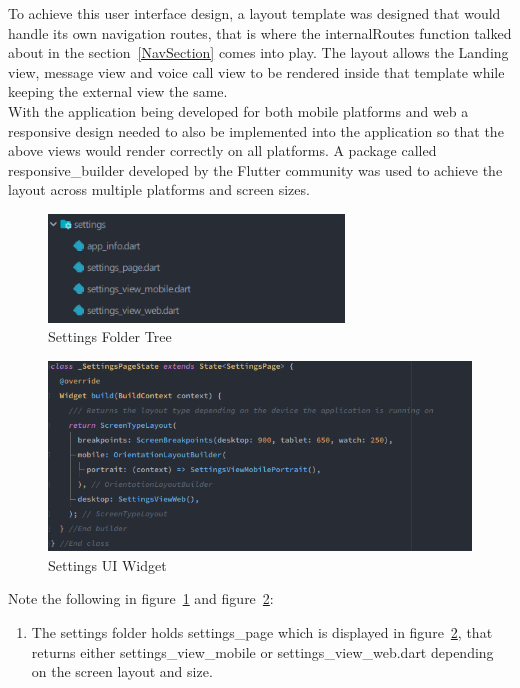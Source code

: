 To achieve this user interface design, a layout template was designed that would handle its own navigation routes, that is where the internalRoutes function talked about in the section~\ref{NavSection} comes into play. The layout allows the Landing view, message view and voice call view to be rendered inside that template while keeping the external view the same.
\\ With the application being developed for both mobile platforms and web a responsive design needed to also be implemented into the application so that the above views would render correctly on all platforms. A package called responsive\_builder developed by the Flutter community was used to achieve the layout across multiple platforms and screen sizes.

\begin{figure}[h!]
    \caption{Settings Folder Tree}
    \label{image:settingsFolderTree}
    \centering
    \includegraphics[width=0.7\textwidth]{images/settings_folder_tree.png}
\end{figure}

\begin{figure}[h!]
    \caption{Settings UI Widget}
    \label{image:settingsUIWidget}
    \centering
    \includegraphics[width=1.0\textwidth]{images/settings_ui_widget.png}
\end{figure}

Note the following in figure~\ref{image:settingsFolderTree} and figure~\ref{image:settingsUIWidget}:
\begin{enumerate}
    \item The settings folder holds settings\_page which is displayed in figure~\ref{image:settingsUIWidget}, that returns either settings\_view\_mobile or settings\_view\_web.dart depending on the screen layout and size.
\end{enumerate}

